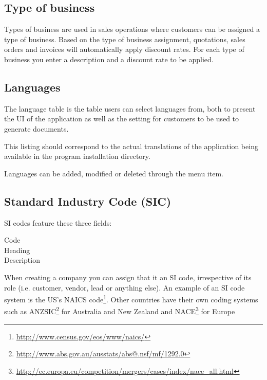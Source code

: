 \subsection{Type of business}
\label{subsec-company-config-business-types}

Types of business are used in sales operations where customers can be assigned a type
of business. Based on the type of business assignment, quotations, sales orders and
invoices will automatically apply discount rates. For each type of business you enter a description and a discount rate to be applied.

\subsection{Languages}
\label{subsec-company-config-languages}

The language table is the table users can select languages from, both to present
the UI of the application as well as the setting for customers to be used to generate
documents.

This listing should correspond to the actual translations of the application being
available in the program installation directory.

Languages can be added, modified or deleted through the  menu item.

\subsection{Standard Industry Code (SIC)}
\label{subsec-company-config-sic}

SI codes feature these three fields:

\begin{description}
\item [Code]
\item [Heading]
\item [Description]
\end{description}

When creating a company you can assign that it an SI code, irrespective of its role (i.e. customer,
vendor, lead or anything else). An example of an SI code system is the
US's NAICS code\footnote{\url{http://www.census.gov/eos/www/naics/}}.
Other countries have their own coding systems such
as ANZSIC\footnote{\url{http://www.abs.gov.au/ausstats/abs@.nsf/mf/1292.0}} for Australia and New Zealand
and NACE\footnote{\url{http://ec.europa.eu/competition/mergers/cases/index/nace\_all.html}} for Europe

